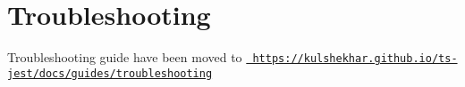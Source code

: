 \chapter{Troubleshooting}
\hypertarget{md_node__modules_2ts-jest_2_t_r_o_u_b_l_e_s_h_o_o_t_i_n_g}{}\label{md_node__modules_2ts-jest_2_t_r_o_u_b_l_e_s_h_o_o_t_i_n_g}
\label{md_node__modules_2ts-jest_2_t_r_o_u_b_l_e_s_h_o_o_t_i_n_g_autotoc_md33593}%
%


Troubleshooting guide have been moved to \href{https://kulshekhar.github.io/ts-jest/docs/guides/troubleshooting}{\texttt{ https\+://kulshekhar.\+github.\+io/ts-\/jest/docs/guides/troubleshooting}} 